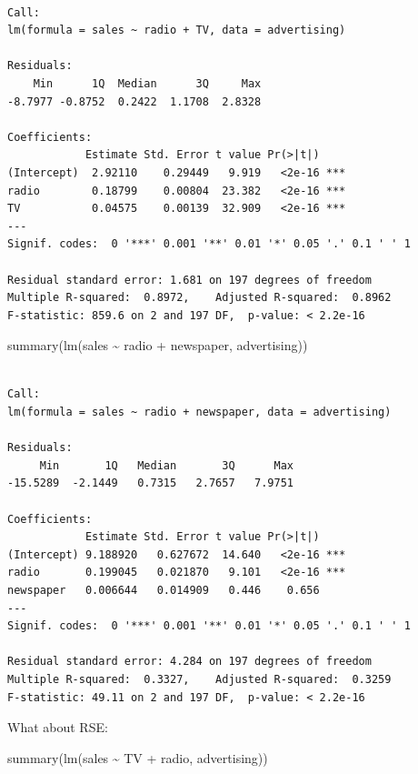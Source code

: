 \documentclass[
  letterpaper,
  DIV=11,
  numbers=noendperiod]{scrreprt}
\newenvironment{Shaded}{\begin{snugshade}}{\end{snugshade}}
\newcommand{\FunctionTok}[1]{\textcolor[rgb]{0.02,0.16,0.49}{#1}}
\newcommand{\NormalTok}[1]{\textcolor[rgb]{0.33,0.33,0.33}{#1}}
\newcommand{\SpecialCharTok}[1]{\textcolor[rgb]{0.00,0.46,0.62}{#1}}
\begin{document}
\begin{verbatim}

Call:
lm(formula = sales ~ radio + TV, data = advertising)

Residuals:
    Min      1Q  Median      3Q     Max 
-8.7977 -0.8752  0.2422  1.1708  2.8328 

Coefficients:
            Estimate Std. Error t value Pr(>|t|)    
(Intercept)  2.92110    0.29449   9.919   <2e-16 ***
radio        0.18799    0.00804  23.382   <2e-16 ***
TV           0.04575    0.00139  32.909   <2e-16 ***
---
Signif. codes:  0 '***' 0.001 '**' 0.01 '*' 0.05 '.' 0.1 ' ' 1

Residual standard error: 1.681 on 197 degrees of freedom
Multiple R-squared:  0.8972,    Adjusted R-squared:  0.8962 
F-statistic: 859.6 on 2 and 197 DF,  p-value: < 2.2e-16
\end{verbatim}

\begin{Shaded}
\begin{Highlighting}[]
\FunctionTok{summary}\NormalTok{(}\FunctionTok{lm}\NormalTok{(sales }\SpecialCharTok{\textasciitilde{}}\NormalTok{ radio }\SpecialCharTok{+}\NormalTok{ newspaper, advertising))}
\end{Highlighting}
\end{Shaded}

\begin{verbatim}

Call:
lm(formula = sales ~ radio + newspaper, data = advertising)

Residuals:
     Min       1Q   Median       3Q      Max 
-15.5289  -2.1449   0.7315   2.7657   7.9751 

Coefficients:
            Estimate Std. Error t value Pr(>|t|)    
(Intercept) 9.188920   0.627672  14.640   <2e-16 ***
radio       0.199045   0.021870   9.101   <2e-16 ***
newspaper   0.006644   0.014909   0.446    0.656    
---
Signif. codes:  0 '***' 0.001 '**' 0.01 '*' 0.05 '.' 0.1 ' ' 1

Residual standard error: 4.284 on 197 degrees of freedom
Multiple R-squared:  0.3327,    Adjusted R-squared:  0.3259 
F-statistic: 49.11 on 2 and 197 DF,  p-value: < 2.2e-16
\end{verbatim}

What about RSE:

\begin{Shaded}
\begin{Highlighting}[]
\FunctionTok{summary}\NormalTok{(}\FunctionTok{lm}\NormalTok{(sales }\SpecialCharTok{\textasciitilde{}}\NormalTok{ TV }\SpecialCharTok{+}\NormalTok{ radio, advertising))}
\end{Highlighting}
\end{Shaded}
\end{document}
